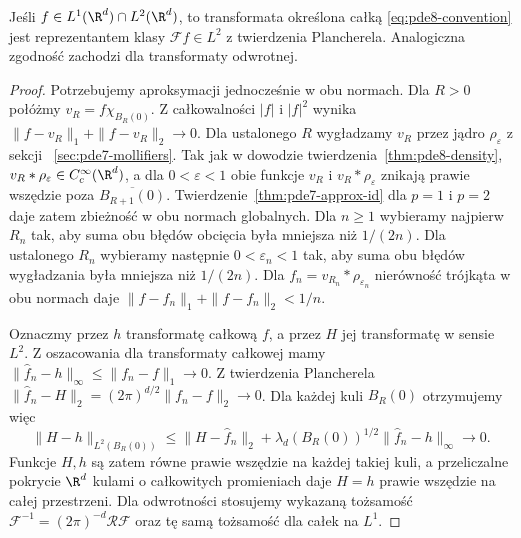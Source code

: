 \begin{stwierdzenie}
Jeśli $f\in L^1(\R^d)\cap L^2(\R^d)$, to
transformata określona całką
\eqref{eq:pde8-convention} jest reprezentantem
klasy $\mathcal Ff\in L^2$ z twierdzenia
Plancherela. Analogiczna zgodność zachodzi
dla transformaty odwrotnej.
\end{stwierdzenie}
\begin{proof}
Potrzebujemy aproksymacji jednocześnie w obu normach.
Dla $R>0$ połóżmy $v_R=f\chi_{B_R(0)}$.
Z całkowalności $|f|$ i $|f|^2$ wynika
$\|f-v_R\|_1+\|f-v_R\|_2\to0$.
Dla ustalonego $R$ wygładzamy $v_R$ przez
jądro $\rho_\varepsilon$ z sekcji
~\ref{sec:pde7-mollifiers}. Tak jak w dowodzie
twierdzenia~\ref{thm:pde8-density},
$v_R*\rho_\varepsilon\in C_c^\infty(\R^d)$,
a dla $0<\varepsilon<1$ obie funkcje
$v_R$ i $v_R*\rho_\varepsilon$ znikają
prawie wszędzie poza $\overline{B_{R+1}(0)}$.
Twierdzenie~\ref{thm:pde7-approx-id} dla
$p=1$ i $p=2$ daje zatem zbieżność w obu
normach globalnych. Dla $n\ge1$ wybieramy
najpierw $R_n$ tak, aby suma obu błędów
obcięcia była mniejsza niż $1/(2n)$.
Dla ustalonego $R_n$ wybieramy następnie
$0<\varepsilon_n<1$ tak, aby suma obu
błędów wygładzania była mniejsza niż $1/(2n)$.
Dla $f_n=v_{R_n}*\rho_{\varepsilon_n}$
nierówność trójkąta w obu normach daje
$\|f-f_n\|_1+\|f-f_n\|_2<1/n$.

Oznaczmy przez $h$ transformatę całkową $f$,
a przez $H$ jej transformatę w sensie $L^2$.
Z oszacowania dla transformaty całkowej
mamy $\|\widehat f_n-h\|_\infty\le\|f_n-f\|_1\to0$.
Z twierdzenia Plancherela
$\|\widehat f_n-H\|_2=(2\pi)^{d/2}\|f_n-f\|_2\to0$.
Dla każdej kuli $B_R(0)$ otrzymujemy więc
\[
 \|H-h\|_{L^2(B_R(0))}
 \le\|H-\widehat f_n\|_2
 +\lambda_d(B_R(0))^{1/2}\|\widehat f_n-h\|_\infty
 \longrightarrow0.
\]
Funkcje $H,h$ są zatem równe prawie wszędzie
na każdej takiej kuli, a przeliczalne pokrycie
$\R^d$ kulami o całkowitych promieniach daje
$H=h$ prawie wszędzie na całej przestrzeni.
Dla odwrotności stosujemy wykazaną tożsamość
$\mathcal F^{-1}=(2\pi)^{-d}\mathcal R\mathcal F$
oraz tę samą tożsamość dla całek na $L^1$.
\end{proof}

